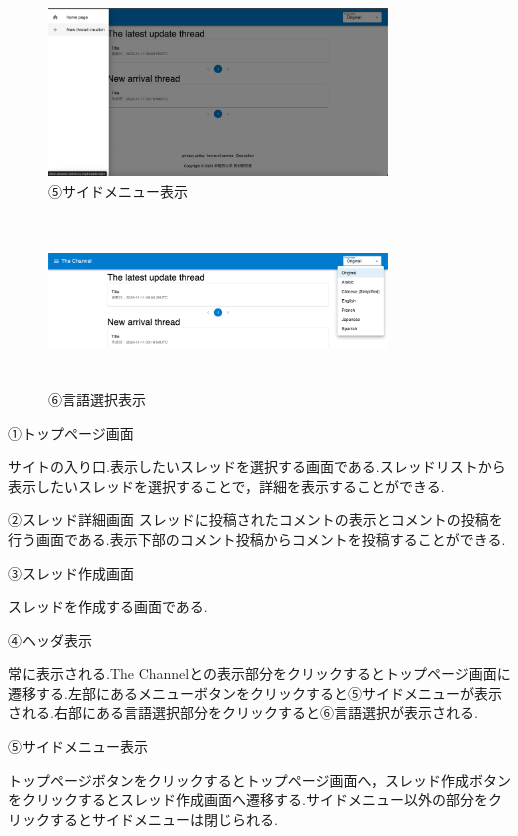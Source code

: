 \documentclass[b5paper,12pt]{jsreport}
\begin{document}
\begin{figure}[htbp]
	\centering
	\includegraphics[width=90mm,height=45mm]{img/side_menu.png}

	\caption*{⑤サイドメニュー表示}
\end{figure}

\begin{figure}[htbp]
	\centering
	\includegraphics[width=90mm,height=45mm]{./img/select_language.png}

	\caption*{⑥言語選択表示}
\end{figure}

①トップページ画面

サイトの入り口.表示したいスレッドを選択する画面である.スレッドリストから表示したいスレッドを選択することで，詳細を表示することができる.

②スレッド詳細画面
スレッドに投稿されたコメントの表示とコメントの投稿を行う画面である.表示下部のコメント投稿からコメントを投稿することができる.

③スレッド作成画面

スレッドを作成する画面である.

④ヘッダ表示

常に表示される.The Channelとの表示部分をクリックするとトップページ画面に遷移する.左部にあるメニューボタンをクリックすると⑤サイドメニューが表示される.右部にある言語選択部分をクリックすると⑥言語選択が表示される.

⑤サイドメニュー表示

トップページボタンをクリックするとトップページ画面へ，スレッド作成ボタンをクリックするとスレッド作成画面へ遷移する.サイドメニュー以外の部分をクリックするとサイドメニューは閉じられる.
\end{document}
